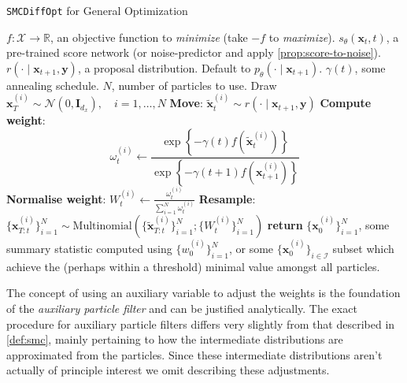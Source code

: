 \begin{algorithm}[ht]
    \caption{\texttt{SMCDiffOpt} for General Optimization} \label{alg:smc-opt}
    \begin{algorithmic}
        \Require $f: \mathcal{X} \to \mathbb{R}$, an objective function to \emph{minimize} (take $-f$ to \emph{maximize}).
        \Require $s_\theta(\mathbf{x}_t, t)$, a pre-trained score network (or noise-predictor and apply \ref{prop:score-to-noise}).
        \Require $r(\cdot \mid \mathbf{x}_{t+1}, \mathbf{y})$, a proposal distribution. Default to $p_\theta(\cdot \mid \mathbf{x}_{t+1})$.
        \Require $\gamma(t)$, some annealing schedule.
        \Require $N$, number of particles to use.
        \State Draw $\mathbf{x}_T^{(i)} \sim \mathcal{N}(0, \mathbf{I}_{d_x}),\quad i=1,\ldots,N$
                \State \textbf{Move}: $\tilde{\mathbf{x}}_{t}^{(i)} \sim r(\cdot \mid \mathbf{x}_{t+1}, \mathbf{y})$
                \State \textbf{Compute weight}:
                \begin{equation}
                    \omega_t^{(i)} \gets \frac{\exp\left\{-\gamma(t) f(\tilde{\mathbf{x}}_t^{(i)})\right\}}{\exp\left\{-\gamma(t+1) f(\mathbf{x}_{t+1}^{(i)})\right\}} \label{eq:weight-formula}
                \end{equation}
                \State \textbf{Normalise weight}: $W_t^{(i)} \gets \frac{\omega_t^{(i)}}{\sum_{i=1}^N \omega_t^{(i)}}$
                \State \textbf{Resample}: $\{\mathbf{x}_{T:t}^{(i)}\}_{i=1}^N \sim \text{Multinomial}\left(\{\tilde{\mathbf{x}}_{T:t}^{(i)}\}_{i=1}^N; \{W_t^{(i)}\}_{i=1}^N\right)$
            \EndFor
        \EndFor
        \State \textbf{return} $\{\mathbf{x}_0^{(i)}\}_{i=1}^N$, some summary statistic computed
        using $\{w_0^{(i)}\}_{i=1}^N$, or some $\{\mathbf{x}_0^{(i)}\}_{i \in \mathcal{I}}$
        subset which achieve the (perhaps within a threshold) minimal value amongst all particles.
    \end{algorithmic}
\end{algorithm}

\begin{remark}
    The concept of using an auxiliary variable to adjust the weights is the foundation of the
    \emph{auxiliary particle filter} \parencite{chopinIntroductionSequentialMonte2020} and can be
    justified analytically. The exact procedure for auxiliary particle filters differs very slightly
    from that described in \ref{def:smc}, mainly pertaining to how the intermediate distributions
    are approximated from the particles. Since these intermediate distributions aren't actually of
    principle interest we omit describing these adjustments.
\end{remark}

